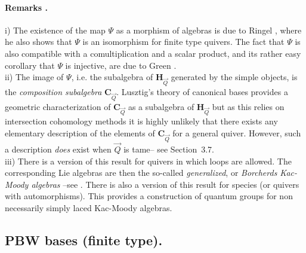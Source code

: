 \documentclass[a4paper,10pt]{amsart}
\numberwithin{equation}{section}
\begin{document}
\addtocounter{theo}{1}
\paragraph{\textbf{Remarks \thetheo.}} i) The existence of the map $\Psi$ as a morphism of algebras is due to Ringel \cite{Ri}, where he also shows that $\Psi$ is an isomorphism for finite type quivers. The fact that $\Psi$ is also compatible with a comultiplication and a scalar product, and its rather easy corollary that $\Psi$ is injective, are due to Green \cite{Green}.\\
ii) The image of $\Psi$, i.e. the subalgebra of $\mathbf{H}_{\vec{Q}}$ generated by the simple objects, is the \textit{composition subalgebra} $\mathbf{C}_{\vec{Q}}$. Lusztig's theory of canonical bases provides a geometric characterization of $\mathbf{C}_{\vec{Q}}$ as a subalgebra of $\mathbf{H}_{\vec{Q}}$ but as this relies on intersection cohomology methods it is highly unlikely that there exists any elementary description of the elements of $\mathbf{C}_{\vec{Q}}$ for a general quiver. However, such a description \textit{does} exist when $\vec{Q}$ is tame-- see Section~3.7.\\
iii) There is a version of this result for quivers in which loops are allowed. The corresponding Lie algebras are then the so-called \textit{generalized}, or \textit{Borcherds Kac-Moody algebras} --see \cite{KangS}. There is also a version of this result for species (or quivers with automorphisms). This provides a construction of quantum groups for non necessarily simply laced Kac-Moody algebras.

\vspace{.2in}

\subsection{PBW bases (finite type).}

\vspace{.15in}
\end{document}
